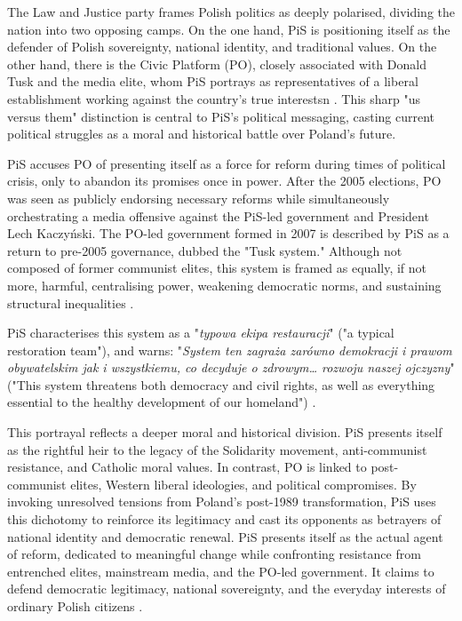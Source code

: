 The Law and Justice party frames Polish politics as deeply polarised, dividing the nation into two opposing camps. On the one hand, PiS is positioning itself as the defender of Polish sovereignty, national identity, and traditional values. On the other hand, there is the Civic Platform (PO), closely associated with Donald Tusk and the media elite, whom PiS portrays as representatives of a liberal establishment working against the country's true interestsn \citep{pis_program_2014}. This sharp "us versus them" distinction is central to PiS's political messaging, casting current political struggles as a moral and historical battle over Poland's future.

PiS accuses PO of presenting itself as a force for reform during times of political crisis, only to abandon its promises once in power. After the 2005 elections, PO was seen as publicly endorsing necessary reforms while simultaneously orchestrating a media offensive against the PiS-led government and President Lech Kaczyński. The PO-led government formed in 2007 is described by PiS as a return to pre-2005 governance, dubbed the "Tusk system." Although not composed of former communist elites, this system is framed as equally, if not more, harmful, centralising power, weakening democratic norms, and sustaining structural inequalities \citep{pis_program_2014}.

PiS characterises this system as a "\textit{typowa ekipa restauracji}" ("a typical restoration team"), and warns: "\textit{System ten zagraża zarówno demokracji i prawom obywatelskim jak i wszystkiemu, co decyduje o zdrowym… rozwoju naszej ojczyzny}" ("This system threatens both democracy and civil rights, as well as everything essential to the healthy development of our homeland") \citep{pis_program_2014}.

This portrayal reflects a deeper moral and historical division. PiS presents itself as the rightful heir to the legacy of the Solidarity movement, anti-communist resistance, and Catholic moral values. In contrast, PO is linked to post-communist elites, Western liberal ideologies, and political compromises. By invoking unresolved tensions from Poland's post-1989 transformation, PiS uses this dichotomy to reinforce its legitimacy and cast its opponents as betrayers of national identity and democratic renewal. PiS presents itself as the actual agent of reform, dedicated to meaningful change while confronting resistance from entrenched elites, mainstream media, and the PO-led government. It claims to defend democratic legitimacy, national sovereignty, and the everyday interests of ordinary Polish citizens \citep{pis_program_2014}.

